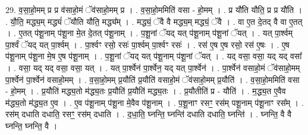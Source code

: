 \documentclass[17pt]{extarticle}
\begin{document}
29. व॒सा॒हो॒मम् प्र प्र व॑साहो॒मं ॅव॑साहो॒मम् प्र । . व॒सा॒हो॒ममिति॑ वसा - हो॒मम् । . प्र यौ॑ति यौति॒ प्र प्र यौ॑ति । . यौ॒ति॒ मद्ध्य॒म् मद्ध्यं॑ ॅयौति यौति॒ मद्ध्य᳚म् । . मद्ध्यं॒ ॅवै वै मद्ध्य॒म् मद्ध्यं॒ ॅवै । . वा ए॒त दे॒तद् वै वा ए॒तत् । . ए॒तत् प॑शू॒नाम् प॑शू॒ना मे॒त दे॒तत् प॑शू॒नाम् । . प॒शू॒नां ॅयद् यत् प॑शू॒नाम् प॑शू॒नां ॅयत् । . यत् पा॒र्श्वम् पा॒र्श्वं ॅयद् यत् पा॒र्श्वम् । . पा॒र्श्वꣳ रसो॒ रसः॑ पा॒र्श्वम् पा॒र्श्वꣳ रसः॑ । . रस॑ ए॒ष ए॒ष रसो॒ रस॑ ए॒षः । . ए॒ष प॑शू॒नाम् प॑शू॒ना मे॒ष ए॒ष प॑शू॒नाम् । . प॒शू॒नां ॅयद् यत् प॑शू॒नाम् प॑शू॒नां ॅयत् । . यद् वसा॒ वसा॒ यद् यद् वसा᳚ । . वसा॒ यद् यद् वसा॒ वसा॒ यत् । . यत् पा॒र्श्वेन॑ पा॒र्श्वेन॒ यद् यत् पा॒र्श्वेन॑ । . पा॒र्श्वेन॑ वसाहो॒मं ॅव॑साहो॒मम् पा॒र्श्वेन॑ पा॒र्श्वेन॑ वसाहो॒मम् । . व॒सा॒हो॒मम् प्र॒यौति॑ प्र॒यौति॑ वसाहो॒मं ॅव॑साहो॒मम् प्र॒यौति॑ । . व॒सा॒हो॒ममिति॑ वसा - हो॒मम् । . प्र॒यौति॑ मद्ध्य॒तो म॑द्ध्य॒तः प्र॒यौति॑ प्र॒यौति॑ मद्ध्य॒तः । . प्र॒यौतीति॑ प्र - यौति॑ । . म॒द्ध्य॒त ए॒वैव म॑द्ध्य॒तो म॑द्ध्य॒त ए॒व । . ए॒व प॑शू॒नाम् प॑शू॒ना मे॒वैव प॑शू॒नाम् । . प॒शू॒नाꣳ रसꣳ॒॒ रस॑म् पशू॒नाम् प॑शू॒नाꣳ रस᳚म् । . रस॑म् दधाति दधाति॒ रसꣳ॒॒ रस॑म् दधाति । . द॒धा॒ति॒ घ्नन्ति॒ घ्नन्ति॑ दधाति दधाति॒ घ्नन्ति॑ । . घ्नन्ति॒ वै वै घ्नन्ति॒ घ्नन्ति॒ वै । \newline
\end{document}

